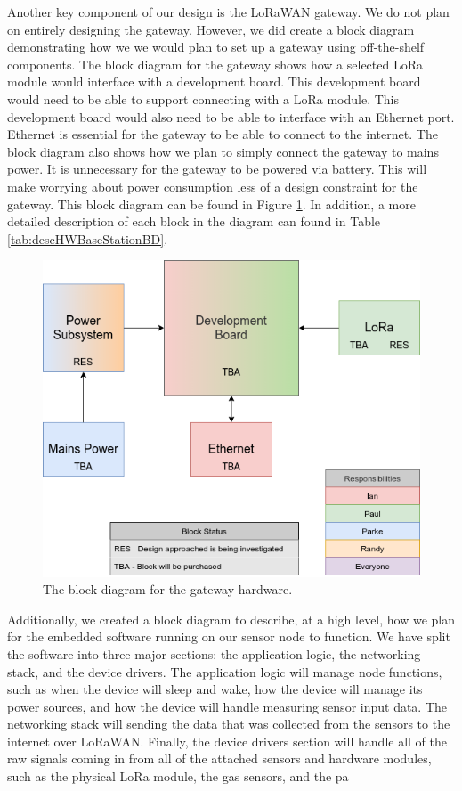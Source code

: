 Another key component of our design is the LoRaWAN gateway. We do not plan on entirely designing the gateway. However, we did create a block diagram demonstrating how we we would plan to set up a gateway using off-the-shelf components. The block diagram for the gateway shows how a selected LoRa module would interface with a development board. This development board would need to be able to support connecting with a LoRa module. This development board would also need to be able to interface with an Ethernet port. Ethernet is essential for the gateway to be able to connect to the internet. The block diagram also shows how we plan to simply connect the gateway to mains power. It is unnecessary for the gateway to be powered via battery. This will make worrying about power consumption less of a design constraint for the gateway. This block diagram can be found in Figure \ref{fig:hwBaseStationBD}. In addition, a more detailed description of each block in the diagram can found in Table \ref{tab:descHWBaseStationBD}.

\begin{figure}[H]
    \centering
    \includegraphics[width=5.3in]{"./figures/hwGatewayBD.png"} 
    \caption{The block diagram for the gateway hardware.}
    \label{fig:hwBaseStationBD}
\end{figure}

Additionally, we created a block diagram to describe, at a high level, how we plan for the embedded software running on our sensor node to function. We have split the software into three major sections: the application logic, the networking stack, and the device drivers. The application logic will manage node functions, such as when the device will sleep and wake, how the device will manage its power sources, and how the device will handle measuring sensor input data. The networking stack will sending the data that was collected from the sensors to the internet over LoRaWAN. Finally, the device drivers section will handle all of the raw signals coming in from all of the attached sensors and hardware modules, such as the physical LoRa module, the gas sensors, and the pa

